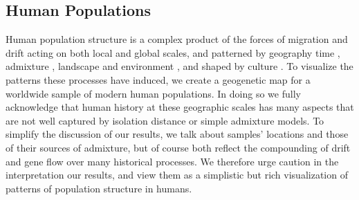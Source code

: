 \documentclass[12pt]{article}
\begin{document}
\subsection*{Human Populations}
Human population structure is a complex product of the forces of migration and drift acting on both local and global scales, and patterned by geography \citep{novembre_genes_2008, ralph2013geography} time \citep{skoglund2012origins, skoglund_investigating_2014}, admixture \citep{Hellenthal},  landscape and environment \citep{Beall2010, Bigham2010, Bradburd2013}, and shaped by culture \citep{reich_india_2009, Atzmon2010, moorjani_history_2011}. To visualize the patterns these processes have induced, we create a geogenetic map for a worldwide sample of modern human populations. In doing so we fully acknowledge that human history at these geographic scales has many aspects that are not well captured by isolation distance or simple admixture models. To simplify the discussion of our results, we talk about samples' locations and those of their sources of admixture, but of course both reflect the compounding of drift and gene flow over many historical processes.  We therefore urge caution in the interpretation our results, and view them as a simplistic but rich visualization of patterns of population structure in humans. 


\end{document}
